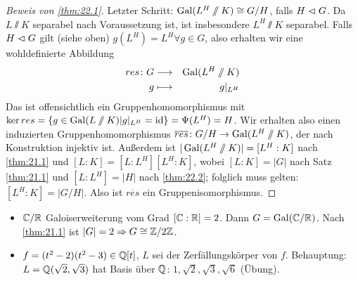 \documentclass[12pt,a4paper]{scrartcl}
\begin{document}
\begin{proof}[Beweis von \ref{thm:22.1}]
Letzter Schritt: $\operatorname{Gal}(L^H\sslash K) \cong G/H$, falls $H\vartriangleleft G$. Da $L\sslash K$ separabel nach Voraussetzung ist, ist insbesondere $L^H\sslash K$ separabel. Falls $H\vartriangleleft G$ gilt (siehe oben) $g(L^H) = L^H\forall g\in G$, also erhalten wir eine wohldefinierte Abbildung
\begin{eqnarray*}
	res\colon G &\longrightarrow & \operatorname{Gal}(L^H\sslash K)\\
	g & \longmapsto & g|_{L^H}
\end{eqnarray*}
Das ist offensichtlich ein Gruppenhomomorphismus mit $\operatorname{ker}{res} = \{g\in \operatorname{Gal}(L\sslash K)|g|_{L^H} = \operatorname{id}\} = \Psi(L^H) = H$. Wir erhalten also einen induzierten Gruppenhomomorphismus $\overline{res}\colon G/H\to \operatorname{Gal}(L^H\sslash K)$, der nach Konstruktion injektiv ist. Außerdem ist $|\operatorname{Gal}(L^H\sslash K)| = [L^H:K]$ nach \ref{thm:21.1} und $[L:K] = [L:L^H][L^H:K]$, wobei $[L:K] = |G|$ nach Satz \ref{thm:21.1} und $[L:L^H] = |H|$ nach \ref{thm:22.2}; folglich muss gelten: $[L^H:K] = |G/H|$. Also ist $\overline{res}$ ein Gruppenisomorphismus.
\end{proof}


\begin{bsp}
	\begin{itemize}
	\item $\mathbb C/\mathbb R$ Galoiserweiterung vom Grad $[\mathbb C:\mathbb R] = 2$. Dann $G = \operatorname{Gal}(\mathbb C/\mathbb R)$. Nach \ref{thm:21.1} ist $|G| = 2\Rightarrow G\cong \mathbb Z/2\mathbb Z$. 
	\item $f = (t^2-2)(t^2-3)\in \mathbb Q[t]$, $L$ sei der Zerfällungskörper von $f$. Behauptung: $L = \mathbb Q(\sqrt{2}, \sqrt{3})$ hat Basis über $\mathbb Q$: $1, \sqrt{2},\sqrt{3}, \sqrt{6}$ (Übung).
	\end{itemize}
\end{bsp}	
\end{document}
